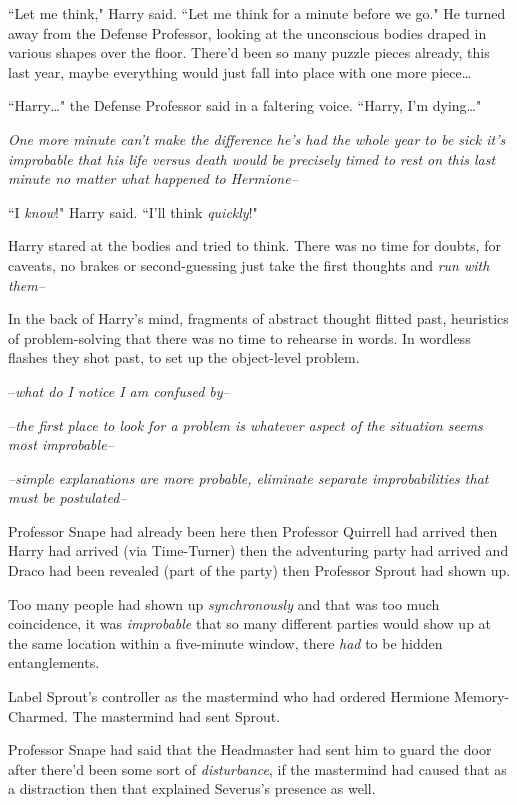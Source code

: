 ``Let me think," Harry said. ``Let me think for a minute before we go." He turned away from the Defense Professor, looking at the unconscious bodies draped in various shapes over the floor. There'd been so many puzzle pieces already, this last year, maybe everything would just fall into place with one more piece{\ldots}

``Harry{\ldots}" the Defense Professor said in a faltering voice. ``Harry, I'm dying{\ldots}"

\emph{One more minute can't make the difference he's had the \emph{whole year} to be sick it's \emph{improbable} that his life versus death would be precisely timed to rest on this last minute no matter what happened to Hermione\---}

``I \emph{know}!" Harry said. ``I'll think \emph{quickly}!"

Harry stared at the bodies and tried to think. There was no time for doubts, for caveats, no brakes or second-guessing just take the first thoughts and \emph{run with them\---}

In the back of Harry's mind, fragments of abstract thought flitted past, heuristics of problem-solving that there was no time to rehearse in words. In wordless flashes they shot past, to set up the object-level problem.

\---\emph{what do I notice I am confused by\---}

\emph{\---the first place to look for a problem is whatever aspect of the situation seems most improbable\---}

\emph{\---simple explanations are more probable, eliminate separate improbabilities that must be postulated\---}

Professor Snape had already been here then Professor Quirrell had arrived then Harry had arrived (via Time-Turner) then the adventuring party had arrived and Draco had been revealed (part of the party) then Professor Sprout had shown up.

Too many people had shown up \emph{synchronously} and that was too much coincidence, it was \emph{improbable} that so many different parties would show up at the same location within a five-minute window, there \emph{had} to be hidden entanglements.

Label Sprout's controller as the mastermind who had ordered Hermione Memory-Charmed. The mastermind had sent Sprout.

Professor Snape had said that the Headmaster had sent him to guard the door after there'd been some sort of \emph{disturbance}, if the mastermind had caused that as a distraction then that explained Severus's presence as well.

